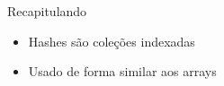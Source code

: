 
\begin{frame}[fragile,t]{Recapitulando}
  \begin{itemize}
    \item Hashes são \alert{coleções indexadas}
    \item Usado de forma \alert{similar aos arrays}
  \end{itemize}
\end{frame}




